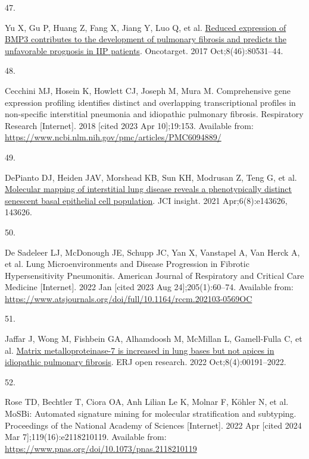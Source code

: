 \documentclass[
]{article}
\newlength{\cslhangindent}
\newlength{\csllabelwidth}
\newenvironment{CSLReferences}[2] %
 {\begin{list}{}{%
  \setlength{\itemindent}{0pt}
  \setlength{\leftmargin}{0pt}
  \setlength{\parsep}{0pt}
  \ifodd #1
   \setlength{\leftmargin}{\cslhangindent}
   \setlength{\itemindent}{-1\cslhangindent}
  \fi
  \setlength{\itemsep}{#2\baselineskip}}}
 {\end{list}}
\newcommand{\CSLLeftMargin}[1]{\parbox[t]{\csllabelwidth}{\strut#1\strut}}
\newcommand{\CSLRightInline}[1]{\parbox[t]{\linewidth - \csllabelwidth}{\strut#1\strut}}
\begin{document}
\begin{CSLReferences}{0}{1}
\CSLLeftMargin{47. }%
\CSLRightInline{Yu X, Gu P, Huang Z, Fang X, Jiang Y, Luo Q, et al. \href{https://doi.org/10.18632/oncotarget.20083}{Reduced expression of {BMP3} contributes to the development of pulmonary fibrosis and predicts the unfavorable prognosis in {IIP} patients}. Oncotarget. 2017 Oct;8(46):80531--44. }

\CSLLeftMargin{48. }%
\CSLRightInline{Cecchini MJ, Hosein K, Howlett CJ, Joseph M, Mura M. Comprehensive gene expression profiling identifies distinct and overlapping transcriptional profiles in non-specific interstitial pneumonia and idiopathic pulmonary fibrosis. Respiratory Research {[}Internet{]}. 2018 {[}cited 2023 Apr 10{]};19:153. Available from: \url{https://www.ncbi.nlm.nih.gov/pmc/articles/PMC6094889/}}

\CSLLeftMargin{49. }%
\CSLRightInline{DePianto DJ, Heiden JAV, Morshead KB, Sun KH, Modrusan Z, Teng G, et al. \href{https://doi.org/10.1172/jci.insight.143626}{Molecular mapping of interstitial lung disease reveals a phenotypically distinct senescent basal epithelial cell population}. JCI insight. 2021 Apr;6(8):e143626, 143626. }

\CSLLeftMargin{50. }%
\CSLRightInline{De Sadeleer LJ, McDonough JE, Schupp JC, Yan X, Vanstapel A, Van Herck A, et al. Lung {Microenvironments} and {Disease} {Progression} in {Fibrotic} {Hypersensitivity} {Pneumonitis}. American Journal of Respiratory and Critical Care Medicine {[}Internet{]}. 2022 Jan {[}cited 2023 Aug 24{]};205(1):60--74. Available from: \url{https://www.atsjournals.org/doi/full/10.1164/rccm.202103-0569OC}}

\CSLLeftMargin{51. }%
\CSLRightInline{Jaffar J, Wong M, Fishbein GA, Alhamdoosh M, McMillan L, Gamell-Fulla C, et al. \href{https://doi.org/10.1183/23120541.00191-2022}{Matrix metalloproteinase-7 is increased in lung bases but not apices in idiopathic pulmonary fibrosis}. ERJ open research. 2022 Oct;8(4):00191--2022. }

\CSLLeftMargin{52. }%
\CSLRightInline{Rose TD, Bechtler T, Ciora OA, Anh Lilian Le K, Molnar F, Köhler N, et al. {MoSBi}: {Automated} signature mining for molecular stratification and subtyping. Proceedings of the National Academy of Sciences {[}Internet{]}. 2022 Apr {[}cited 2024 Mar 7{]};119(16):e2118210119. Available from: \url{https://www.pnas.org/doi/10.1073/pnas.2118210119}}


\end{CSLReferences}
\end{document}
